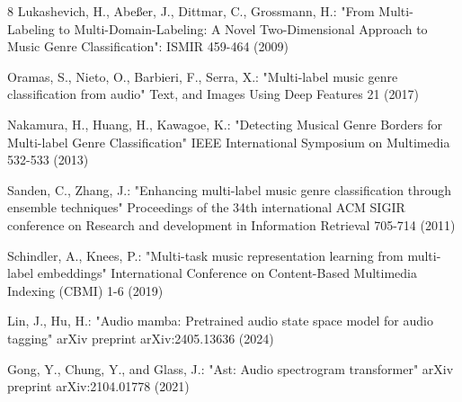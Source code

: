 \documentclass[runningheads]{llncs}
\begin{document}
\begin{thebibliography}{8}
Lukashevich, H., Abe{\ss}er, J., Dittmar, C., Grossmann, H.: "From Multi-Labeling to Multi-Domain-Labeling: A Novel Two-Dimensional Approach to Music Genre Classification": ISMIR 459-464 (2009)

Oramas, S., Nieto, O., Barbieri, F., Serra, X.: "Multi-label music genre classification from audio" Text, and Images Using Deep Features 21 (2017)

Nakamura, H., Huang, H., Kawagoe, K.: "Detecting Musical Genre Borders for Multi-label Genre Classification" IEEE International Symposium on Multimedia 532-533 (2013)


Sanden, C., Zhang, J.: "Enhancing multi-label music genre classification through ensemble techniques" Proceedings of the 34th international ACM SIGIR conference on Research and development in Information Retrieval 705-714 (2011)

Schindler, A., Knees, P.: "Multi-task music representation learning from multi-label embeddings" International Conference on Content-Based Multimedia Indexing (CBMI) 1-6 (2019)

Lin, J., Hu, H.: "Audio mamba: Pretrained audio state space model for audio tagging" arXiv preprint arXiv:2405.13636 (2024)

Gong, Y., Chung, Y., and Glass, J.: "Ast: Audio spectrogram transformer" arXiv preprint arXiv:2104.01778 (2021)

\end{thebibliography}
\end{document}
